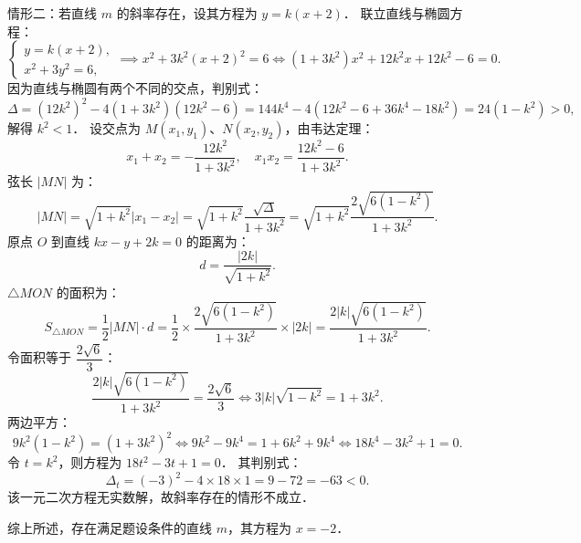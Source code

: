 \begin{answer}
情形二：若直线 $m$ 的斜率存在，设其方程为 $y = k(x + 2)$．
联立直线与椭圆方程：
\nopagebreak[4]
\[
\begin{cases}
y = k(x + 2), \\
x^2 + 3y^2 = 6,
\end{cases}
\implies x^2 + 3k^2(x + 2)^2 = 6 \iff (1 + 3k^2)x^2 + 12k^2 x + 12k^2 - 6 = 0.
\]
因为直线与椭圆有两个不同的交点，判别式：
\nopagebreak[4]
\[
\Delta = (12k^2)^2 - 4(1 + 3k^2)(12k^2 - 6) = 144k^4 - 4(12k^2 - 6 + 36k^4 - 18k^2) = 24(1 - k^2) > 0,
\]
解得 $k^2 < 1$．
设交点为 $M(x_1, y_1)$、$N(x_2, y_2)$，由韦达定理：
\nopagebreak[4]
\[
x_1 + x_2 = -\frac{12k^2}{1 + 3k^2}, \quad x_1 x_2 = \frac{12k^2 - 6}{1 + 3k^2}.
\]
弦长 $|MN|$ 为：
\nopagebreak[4]
\[
|MN| = \sqrt{1 + k^2} |x_1 - x_2| = \sqrt{1 + k^2} \frac{\sqrt{\Delta}}{1 + 3k^2} = \sqrt{1 + k^2} \frac{2\sqrt{6(1 - k^2)}}{1 + 3k^2}.
\]
原点 $O$ 到直线 $kx - y + 2k = 0$ 的距离为：
\nopagebreak[4]
\[
d = \frac{|2k|}{\sqrt{1 + k^2}}.
\]
$\triangle MON$ 的面积为：
\nopagebreak[4]
\[
S_{\triangle MON} = \frac{1}{2} |MN| \cdot d = \frac{1}{2} \times \frac{2\sqrt{6(1 - k^2)}}{1 + 3k^2} \times |2k| = \frac{2|k|\sqrt{6(1 - k^2)}}{1 + 3k^2}.
\]
令面积等于 $\dfrac{2\sqrt{6}}{3}$：
\nopagebreak[4]
\[
\frac{2|k|\sqrt{6(1 - k^2)}}{1 + 3k^2} = \frac{2\sqrt{6}}{3} \iff 3|k|\sqrt{1 - k^2} = 1 + 3k^2.
\]
两边平方：
\nopagebreak[4]
\[
9k^2(1 - k^2) = (1 + 3k^2)^2 \iff 9k^2 - 9k^4 = 1 + 6k^2 + 9k^4 \iff 18k^4 - 3k^2 + 1 = 0.
\]
令 $t = k^2$，则方程为 $18t^2 - 3t + 1 = 0$．
其判别式：
\nopagebreak[4]
\[
\Delta_t = (-3)^2 - 4 \times 18 \times 1 = 9 - 72 = -63 < 0.
\]
该一元二次方程无实数解，故斜率存在的情形不成立．

综上所述，存在满足题设条件的直线 $m$，其方程为 $x = -2$．



\end{answer}
